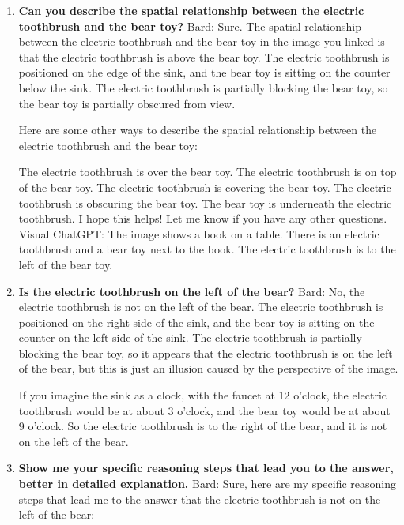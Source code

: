     \begin{enumerate}
        \item \textbf{Can you describe the spatial relationship between the electric toothbrush and the bear toy?}
        \subitem Bard: Sure. The spatial relationship between the electric toothbrush and the bear toy in the image you linked is that the electric toothbrush is above the bear toy. The electric toothbrush is positioned on the edge of the sink, and the bear toy is sitting on the counter below the sink. The electric toothbrush is partially blocking the bear toy, so the bear toy is partially obscured from view.

        Here are some other ways to describe the spatial relationship between the electric toothbrush and the bear toy:
        
        The electric toothbrush is over the bear toy.
        The electric toothbrush is on top of the bear toy.
        The electric toothbrush is covering the bear toy.
        The electric toothbrush is obscuring the bear toy.
        The bear toy is underneath the electric toothbrush.
        I hope this helps! Let me know if you have any other questions.
        \subitem Visual ChatGPT: The image shows a book on a table. There is an electric toothbrush and a bear toy next to the book. The electric toothbrush is to the left of the bear toy.
        \item \textbf{Is the electric toothbrush on the left of the bear?}
        \subitem Bard: 
        No, the electric toothbrush is not on the left of the bear. The electric toothbrush is positioned on the right side of the sink, and the bear toy is sitting on the counter on the left side of the sink. The electric toothbrush is partially blocking the bear toy, so it appears that the electric toothbrush is on the left of the bear, but this is just an illusion caused by the perspective of the image.
        
        If you imagine the sink as a clock, with the faucet at 12 o'clock, the electric toothbrush would be at about 3 o'clock, and the bear toy would be at about 9 o'clock. So the electric toothbrush is to the right of the bear, and it is not on the left of the bear.
        \item \textbf{Show me your specific reasoning steps that lead you to the answer, better in detailed explanation.}
        \subitem Bard: 
        Sure, here are my specific reasoning steps that lead me to the answer that the electric toothbrush is not on the left of the bear:
        

\end{enumerate}
